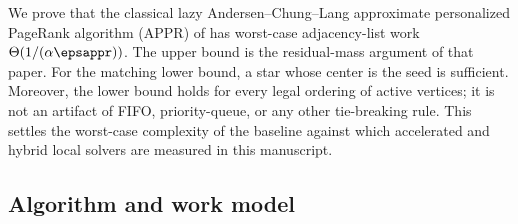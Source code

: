 %

We prove that the classical lazy Andersen--Chung--Lang approximate
personalized PageRank algorithm (APPR) of \citet{andersen2007using} has
worst-case adjacency-list work
\(\Theta(1/(\alpha\epsappr))\).
The upper bound is the residual-mass argument of that paper. For the matching
lower bound, a star whose center is the seed is sufficient. Moreover, the
lower bound holds for every legal ordering of active vertices; it is not an
artifact of FIFO, priority-queue, or any other tie-breaking rule. This
settles the worst-case complexity of the baseline against which accelerated
and hybrid local solvers are measured in this manuscript.

\subsection{Algorithm and work model}
\label{subsec:appr-work-model}

